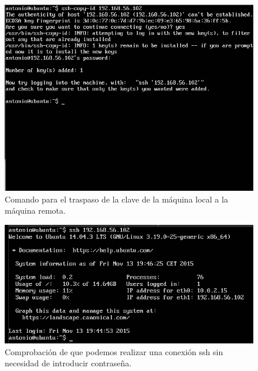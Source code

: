 \begin{figure}[H]
    \begin{center}
        \includegraphics[scale=0.45]{imagenes/img3}
        \caption{Comando para el traspaso de la clave de la máquina local a la máquina remota.}
        \label{fig3}
    \end{center}
\end{figure}

\begin{figure}[H]
    \begin{center}
        \includegraphics[scale=0.5]{imagenes/img4}
        \caption{Comprobación de que podemos realizar una conexión ssh sin necesidad de introducir contraseña.}
        \label{fig4}
    \end{center}
\end{figure}







